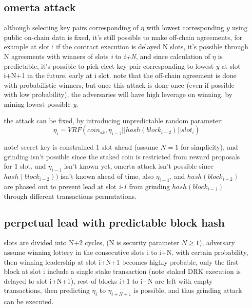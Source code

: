 \documentclass{article}
\begin{document}
\subsection {omerta attack}
although selecting key pairs corresponding of $\eta$ with lowest corresponding $y$ using public on-chain data is fixed, it's still possible to make off-chain agreements, for example at slot i if the contract execution is delayed N slots, it's possible through N agreements with winners of slots \emph{i} to \emph{i+N}, and since calculation of $\eta$ is predictable, it's possible to pick elect key pair corresponding to lowest \emph{y} at slot i+N+1 in the future, early at i slot.
note that the off-chain agreement is done with probabilistic winners, but once this attack is done once (even if possible with low probability), the adversaries will have high leverage on winning, by mining lowest possible \emph{y}.

the attack can be fixed, by introducing unpredictable random parameter: $$\eta_i = VRF(coin_{sk}, \eta_{i-1}||hash(block_{i-2})||slot_i)$$


note! secret key is constrained 1 slot ahead (assume $N=1$ for simplicity), and grinding isn't possible since the staked coin is restricted from reward proposals for 1 slot, and $\eta_{i-1}$ isn't known yet, omerta attack isn't possible since $hash(block_{i-2}))$ isn't known ahead of time, also $\eta_{i-1}$, and $hash(block_{i-2})$ are phased out to prevent lead at slot \emph{i-1} from grinding $hash(block_{i-1})$  through different transactions permutations.

\subsection {perpetual lead with predictable block hash}


slots are divided into N+2 cycles, (N is security parameter $N \ge 1$), adversary assume winning lottery in the consecutive slots i to i+N, with certain probability, then winning leadership at slot i+N+1 becomes highly probable, only the first block at slot i include a single stake transaction (note staked DRK execution is delayed to slot i+N+1), rest of blocks i+1 to i+N are left with empty transactions, then predicting $\eta_i$ to $\eta_{i+N+1}$ is possible, and thus grinding attack can be executed.
\end{document}
